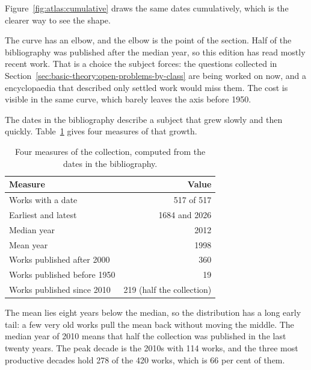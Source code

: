 Figure~\ref{fig:atlas:cumulative} draws the same dates cumulatively, which is
the clearer way to see the shape.


The curve has an elbow, and the elbow is the point of the section. Half of the
bibliography was published after the median year, so this edition has read
mostly recent work. That is a choice the subject forces: the questions collected in
Section~\ref{sec:basic-theory:open-problems-by-class} are being worked on now, and a
encyclopaedia that described only settled work would miss them. The cost is visible in the same
curve, which barely leaves the axis before 1950.

The dates in the bibliography describe a subject that grew slowly and then
quickly.
Table~\ref{tab:atlas:growth} gives four measures of that growth.

\begin{table}[htbp]
  \centering
  \caption{Four measures of the collection, computed from the dates in the
  bibliography.}
  \label{tab:atlas:growth}
  \begin{tabular}{lr}
    \toprule
    Measure & Value \\
    \midrule
    Works with a date            & 517 of 517 \\
    Earliest and latest          & 1684 and 2026 \\
    Median year                  & 2012 \\
    Mean year                    & 1998 \\
    Works published after 2000   & 360 \\
    Works published before 1950  & 19 \\
    Works published since 2010   & 219 (half the collection) \\
    \bottomrule
  \end{tabular}
\end{table}

The mean lies eight years below the median, so the distribution has a long
early tail: a few very old works pull the mean back without moving the middle.
The median year of 2010 means that half the collection was published in the
last twenty years.
The peak decade is the 2010s with 114 works, and the three most productive
decades hold 278 of the 420 works, which is 66 per cent of them.

